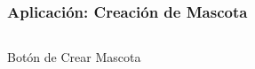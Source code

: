 \documentclass[14pt]{beamer}
\begin{document}
\begin{frame}
\frametitle{Aplicación: Creación de Mascota}

\begin{columns}

\begin{column}{0.5\textwidth}
\begin{center}

\begin{small}


\caption{Botón de Crear Mascota}
\end{small}
\end{center}
\end{column}



\begin{column}{0.5\textwidth}
\begin{center}


\end{center}
\end{column}
\end{columns}
\end{frame}
\end{document}
